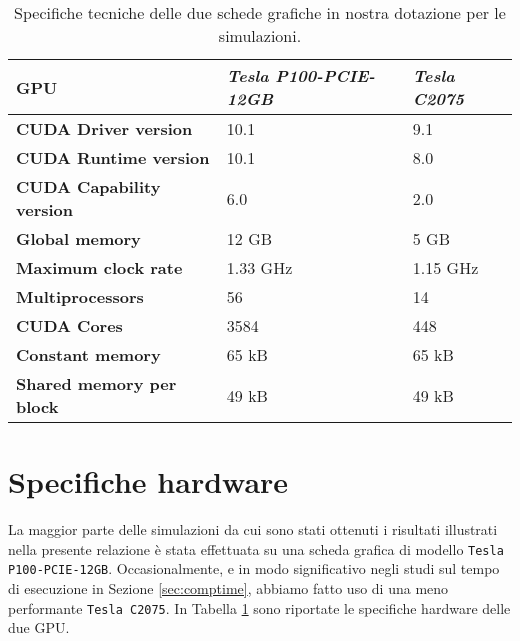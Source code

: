 \begin{table}[t]
\small
\centering
\begin{tabular}{|l||l|l|}
\hline
\textbf{GPU} & \textit{Tesla P100-PCIE-12GB} & \textit{Tesla C2075} \\
\hline \hline
\textbf{CUDA Driver version} & 10.1 & 9.1 \\ \hline
\textbf{CUDA Runtime version} & 10.1 & 8.0 \\ \hline
\textbf{CUDA Capability version} & 6.0 & 2.0 \\ \hline
\textbf{Global memory} & 12 GB &  5 GB \\ \hline
\textbf{Maximum clock rate} & 1.33 GHz & 1.15 GHz \\ \hline
\textbf{Multiprocessors} & 56 & 14 \\ \hline
\textbf{CUDA Cores} & 3584 & 448 \\ \hline
\textbf{Constant memory} & 65 kB & 65 kB \\ \hline
\textbf{Shared memory per block} & 49 kB & 49 kB \\
\hline
\end{tabular}
\caption{Specifiche tecniche delle due schede grafiche in nostra dotazione per le simulazioni.}
\label{tab:hardware}
\end{table}

\section{Specifiche hardware}
La maggior parte delle simulazioni da cui sono stati ottenuti i risultati illustrati nella presente relazione è stata effettuata su una scheda grafica di modello \verb|Tesla P100-PCIE-12GB|. Occasionalmente, e in modo significativo negli studi sul tempo di esecuzione in Sezione \ref{sec:comptime}, abbiamo fatto uso di una meno performante \verb|Tesla C2075|. In Tabella \ref{tab:hardware} sono riportate le specifiche hardware delle due GPU.